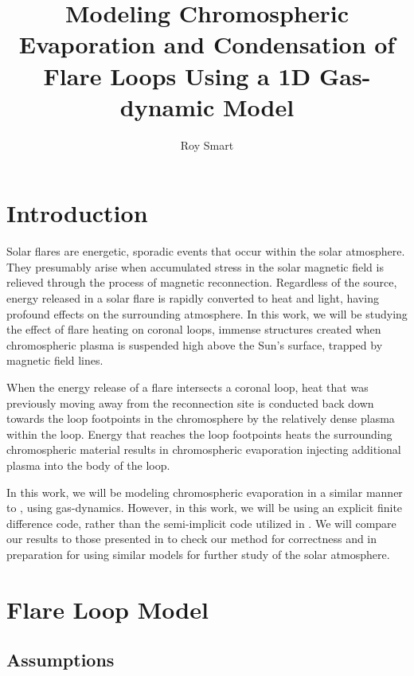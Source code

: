\documentclass[iop]{emulateapj}
\begin{document}
	
	\title{Modeling Chromospheric Evaporation and Condensation of Flare Loops Using a 1D Gas-dynamic Model}
	\author{Roy Smart}
	
	\begin{abstract}
		
	\end{abstract}
	
	\section{Introduction}
	
		Solar flares are energetic, sporadic events that occur within the solar atmosphere. They presumably arise when accumulated stress in the solar magnetic field is relieved through the process of magnetic reconnection. Regardless of the source, energy released in a solar flare is rapidly converted to heat and light, having profound effects on the surrounding atmosphere. In this work, we will be studying the effect of flare heating on coronal loops, immense structures created when chromospheric plasma is suspended high above the Sun's surface, trapped by magnetic field lines.
		
		When the energy release of a flare intersects a coronal loop, heat that was previously moving away from the reconnection site is conducted back down towards the loop footpoints in the chromosphere by the relatively dense plasma within the loop. Energy that reaches the loop footpoints heats the surrounding chromospheric material results in chromospheric evaporation injecting additional plasma into the body of the loop.
		
		In this work, we will be modeling chromospheric evaporation in a similar manner to \cite{2014ApJ...795...10L}, using gas-dynamics. However, in this work, we will be using an explicit finite difference code, rather than the semi-implicit code utilized in \cite{2014ApJ...795...10L}. We will compare our results to those presented in \cite{2014ApJ...795...10L} to check our method for correctness and in preparation for using similar models for further study of the solar atmosphere.
		
	\section{Flare Loop Model}

		\subsection{Assumptions}
		
\end{document}
